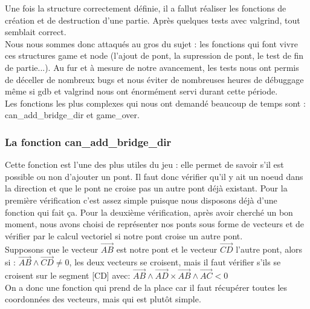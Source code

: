 \documentclass[12pt]{report}
\begin{document}
\textnormal{Une fois la structure correctement définie, il a fallut réaliser les fonctions de création et de destruction d'une partie. Après quelques tests avec valgrind, tout semblait correct.\\ Nous nous sommes donc attaqués au gros du sujet : les fonctions qui font vivre ces structures game et node (l'ajout de pont, la supression de pont, le test de fin de partie...). Au fur et à mesure de notre avancement, les tests nous ont permis de déceller de nombreux bugs et nous éviter de nombreuses heures de débuggage même si gdb et valgrind nous ont énormément servi durant cette période.\\ Les fonctions les plus complexes qui nous ont demandé beaucoup de temps sont : can\_add\_bridge\_dir et game\_over.}

\subsubsection{La fonction can\_add\_bridge\_dir}
\textnormal{Cette fonction est l'une des plus utiles du jeu : elle permet de savoir s'il est possible ou non d'ajouter un pont. Il faut donc vérifier qu'il y ait un noeud dans la direction et que le pont ne croise pas un autre pont déjà existant. Pour la première vérification c'est assez simple puisque nous disposons déjà d'une fonction qui fait ça. Pour la deuxième vérification, après avoir cherché un bon moment, nous avons choisi de représenter nos ponts sous forme de vecteurs et de vérifier par le calcul vectoriel si notre pont croise un autre pont. \\ Supposons que le vecteur $\overrightarrow{AB}$ est notre pont et le vecteur $\overrightarrow{CD}$ l'autre pont, alors si : $\overrightarrow{AB} \land \overrightarrow{CD} \neq 0$, les deux vecteurs se croisent, mais il faut vérifier s'ils se croisent sur le segment [CD] avec: $\overrightarrow{AB} \land \overrightarrow{AD} \times \overrightarrow{AB} \land \overrightarrow{AC} < 0$\\On a donc une fonction qui prend de la place car il faut récupérer toutes les coordonnées des vecteurs, mais qui est plutôt simple.}
\end{document}
